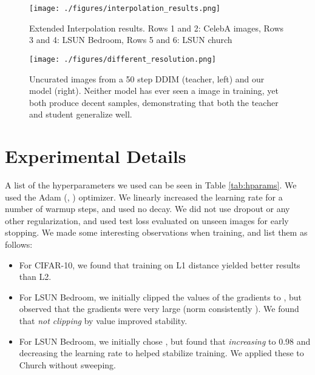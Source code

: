 \documentclass[12pt,a4paper]{article}
\newcommand{\citep}[1]{\citeauthor{#1}, \citeyear{#1}}
\begin{document}
\begin{figure}[H] 
\centering
\texttt{[image: ./figures/interpolation\_results.png]}
\caption{Extended Interpolation results. Rows 1 and 2: CelebA images, Rows 3 and 4: LSUN Bedroom, Rows 5 and 6: LSUN church}
\label{fig11interpolation_results}
\end{figure}

\begin{figure}[H] 
\centering
\texttt{[image: ./figures/different\_resolution.png]}
\caption{Uncurated  images from a 50 step DDIM (teacher, left) and our model (right). Neither model has ever seen a  image in training, yet both produce decent samples, demonstrating that both the teacher and student generalize well.}
\label{fig12different_resolution}
\end{figure}

\section{Experimental Details} \label{experimentaldetails}
A list of the hyperparameters we used can be seen in Table \ref{tab:hparams}. We used the Adam (\citep{adam}) optimizer. We linearly increased the learning rate for a number of warmup steps, and used no decay. We did not use dropout or any other regularization, and used test loss evaluated on unseen images for early stopping. We made some interesting observations when training, and list them as follows:
\begin{itemize} 
\item{For CIFAR-10, we found that training on L1 distance yielded better results than L2.}
\item{For LSUN Bedroom, we initially clipped the values of the gradients to , but observed that the gradients were very large (norm consistently ). We found that \textit{not clipping} by value improved stability.} 
\item{For LSUN Bedroom, we initially chose , but found that  \textit{increasing}  to 0.98 and decreasing the learning rate to  helped stabilize  training. We applied these to Church without sweeping.}
\end{itemize}
\end{document}
